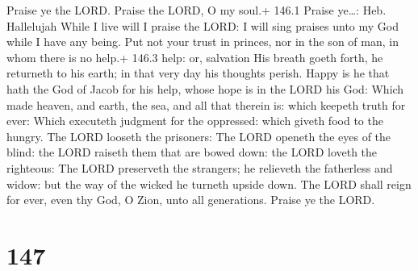  Praise ye the LORD. Praise the LORD, O my soul.+ 146.1
Praise ye\ldots: Heb. Hallelujah  While I live will I praise
the LORD: I will sing praises unto my God while I have any being.
 Put not your trust in princes, nor in the son of man, in
whom there is no help.+ 146.3 help: or, salvation  His
breath goeth forth, he returneth to his earth; in that very day his
thoughts perish.  Happy is he that hath the God of Jacob for
his help, whose hope is in the LORD his God:  Which made
heaven, and earth, the sea, and all that therein is: which keepeth truth
for ever:  Which executeth judgment for the oppressed: which
giveth food to the hungry. The LORD looseth the prisoners: 
The LORD openeth the eyes of the blind: the LORD raiseth them that are
bowed down: the LORD loveth the righteous:  The LORD
preserveth the strangers; he relieveth the fatherless and widow: but the
way of the wicked he turneth upside down.  The LORD shall
reign for ever, even thy God, O Zion, unto all generations. Praise ye
the LORD.

\hypertarget{section-147}{%
\section{147}\label{section-147}}


